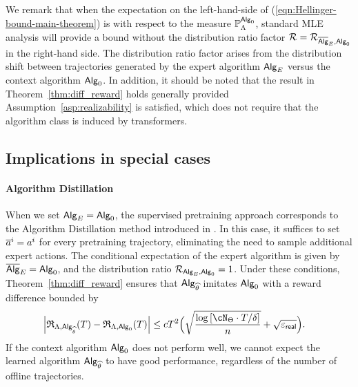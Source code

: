 We remark that when the expectation on the left-hand-side of (\ref{eqn:Hellinger-bound-main-theorem}) is with respect to the measure $\mathbb{P}_{\Lambda}^{{\mathsf{Alg}}_0}$, standard MLE analysis will provide a bound without the distribution ratio factor ${\mathcal{R}} = {\mathcal{R}}_{\overline{\mathsf{Alg}}_{E},{\mathsf{Alg}}_0}$ in the right-hand side. The distribution ratio factor arises from the distribution shift between trajectories generated by the expert algorithm ${\mathsf{Alg}}_{E}$ versus the context algorithm ${\mathsf{Alg}}_0$.  In addition, it should be noted that the result in Theorem~\ref{thm:diff_reward} holds generally provided Assumption~\ref{asp:realizability} is satisfied, which does not require that the algorithm class is induced by transformers.







\subsection{Implications in special cases}

\paragraph{Algorithm Distillation} When we set ${\mathsf{Alg}}_{E} = {\mathsf{Alg}}_0$, the supervised pretraining approach corresponds to the Algorithm Distillation method introduced in \cite{laskin2022context}. In this case, it suffices to set ${\overline{a}}^{i} = {a}^{i}$ for every pretraining trajectory, eliminating the need to sample additional expert actions. The conditional expectation of the expert algorithm is given by $\overline{\mathsf{Alg}}_{E} = {\mathsf{Alg}}_0$, and the distribution ratio ${\mathcal{R}}_{{\mathsf{Alg}}_{E},{\mathsf{Alg}}_0}=1$. Under these conditions, Theorem~\ref{thm:diff_reward} ensures that ${\mathsf{Alg}}_{\widehat{\theta}}$ imitates ${\mathsf{Alg}}_0$ with a reward difference bounded by
\begin{align*}
\Big|\totreward_{\prior,\sAlg_\EstPar}(\totlen)-\totreward_{\prior,\sAlg_0}(\totlen)\Big|
&\leq c \totlen^2 \Big( \sqrt{\frac{\log \brac{ \cN_{\Parspace} \cdot \totlen/\delta } }{n} } + \sqrt{\geneps} \Big). 
\end{align*}
If the context algorithm ${\mathsf{Alg}}_0$ does not perform well, we cannot expect the learned algorithm ${\mathsf{Alg}}_{\widehat{\theta}}$ to have good performance, regardless of the number of offline trajectories. 

